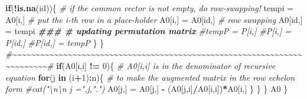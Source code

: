 \documentclass[
]{book}
\newenvironment{Shaded}{\begin{snugshade}}{\end{snugshade}}
\newcommand{\CommentTok}[1]{\textcolor[rgb]{0.56,0.35,0.01}{\textit{#1}}}
\newcommand{\ControlFlowTok}[1]{\textcolor[rgb]{0.13,0.29,0.53}{\textbf{#1}}}
\newcommand{\DecValTok}[1]{\textcolor[rgb]{0.00,0.00,0.81}{#1}}
\newcommand{\DocumentationTok}[1]{\textcolor[rgb]{0.56,0.35,0.01}{\textbf{\textit{#1}}}}
\newcommand{\FunctionTok}[1]{\textcolor[rgb]{0.13,0.29,0.53}{\textbf{#1}}}
\newcommand{\NormalTok}[1]{#1}
\newcommand{\OtherTok}[1]{\textcolor[rgb]{0.56,0.35,0.01}{#1}}
\newcommand{\SpecialCharTok}[1]{\textcolor[rgb]{0.81,0.36,0.00}{\textbf{#1}}}
\begin{document}
\begin{Shaded}
\begin{Highlighting}[]
              \ControlFlowTok{if}\NormalTok{(}\SpecialCharTok{!}\FunctionTok{is.na}\NormalTok{(id))\{     }\CommentTok{\# if the common vector is not empty, do row{-}swapping!}
\NormalTok{              tempi }\OtherTok{=}\NormalTok{ A0[i,]                    }\CommentTok{\# put the i{-}th row in a place{-}holder}
\NormalTok{              A0[i,] }\OtherTok{=}\NormalTok{ A0[id,]                  }\CommentTok{\# row swapping}
\NormalTok{              A0[id,] }\OtherTok{=}\NormalTok{ tempi    }
              \DocumentationTok{\#\#\#                               \# updating permutation matrix}
              \CommentTok{\#tempP = P[i,]}
              \CommentTok{\#P[i,] = P[id,]                    }
              \CommentTok{\#P[id,] = tempP }
\NormalTok{             \}}
\NormalTok{       \}}
      \CommentTok{\#\textasciitilde{}\textasciitilde{}\textasciitilde{}\textasciitilde{}\textasciitilde{}\textasciitilde{}\textasciitilde{}\textasciitilde{}\textasciitilde{}\textasciitilde{}\textasciitilde{}\textasciitilde{}\textasciitilde{}\textasciitilde{}\textasciitilde{}\textasciitilde{}\textasciitilde{}\textasciitilde{}\textasciitilde{}\textasciitilde{}\textasciitilde{}\textasciitilde{}\textasciitilde{}\textasciitilde{}\textasciitilde{}\textasciitilde{}\textasciitilde{}\textasciitilde{}\textasciitilde{}\textasciitilde{}\textasciitilde{}\textasciitilde{}\textasciitilde{}\textasciitilde{}\textasciitilde{}\textasciitilde{}\textasciitilde{}\textasciitilde{}\textasciitilde{}\textasciitilde{}\textasciitilde{}\textasciitilde{}\textasciitilde{}\textasciitilde{}\textasciitilde{}\textasciitilde{}\textasciitilde{}\textasciitilde{}\textasciitilde{}\textasciitilde{}\textasciitilde{}\textasciitilde{}\textasciitilde{}\textasciitilde{}\textasciitilde{}\textasciitilde{}\textasciitilde{}\textasciitilde{}\textasciitilde{}\textasciitilde{}\textasciitilde{}\textasciitilde{}\textasciitilde{}\textasciitilde{}\textasciitilde{}\textasciitilde{}\textasciitilde{}\textasciitilde{}\textasciitilde{}\textasciitilde{}\textasciitilde{}\textasciitilde{}\#}
       \ControlFlowTok{if}\NormalTok{(A0[i,i] }\SpecialCharTok{!=} \DecValTok{0}\NormalTok{)\{    }\CommentTok{\# A0[i,i] is in the denominator of recursive equation}
          \ControlFlowTok{for}\NormalTok{(j }\ControlFlowTok{in}\NormalTok{ (i}\SpecialCharTok{+}\DecValTok{1}\NormalTok{)}\SpecialCharTok{:}\NormalTok{n)\{  }\CommentTok{\# to make the augmented matrix in the row echelon form}
             \CommentTok{\#cat("\textbackslash{}n\textbackslash{}n j =",j,".")}
\NormalTok{             A0[j,] }\OtherTok{=}\NormalTok{ A0[j,] }\SpecialCharTok{{-}}\NormalTok{ (A0[j,i]}\SpecialCharTok{/}\NormalTok{A0[i,i])}\SpecialCharTok{*}\NormalTok{A0[i,]}
\NormalTok{           \}}
\NormalTok{        \}}
\NormalTok{      \}}
\NormalTok{   A0 }
\NormalTok{ \}}
\end{Highlighting}
\end{Shaded}
\end{document}
